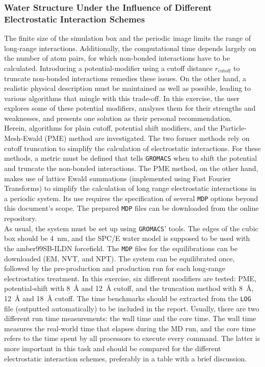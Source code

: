 \documentclass[9pt,tutorial]{livecoms}
\begin{document}
\subsubsection*{Water Structure Under the Influence of Different Electrostatic Interaction Schemes}
The finite size of the simulation box and the periodic image limits the range of long-range interactions. Additionally, the computational time depends largely on the number of atom pairs, for which non-bonded interactions have to be calculated. Introducing a potential-modifier using a cutoff distance $r_\text{cutoff}$ to truncate non-bonded interactions remedies these issues. On the other hand, a realistic physical description must be maintained as well as possible, leading to various algorithms that mingle with this trade-off. In this exercise, the user explores some of these potential modifiers, analyses them for their strengths and weaknesses, and presents one solution as their personal recommendation.\\
Herein, algorithms for plain cutoff, potential shift modifiers, and the Particle-Mesh-Ewald (PME) method are investigated. The two former methods rely on cutoff truncation to simplify the calculation of electrostatic interactions. For these methods, a metric must be defined that tells \texttt{GROMACS} when to shift the potential and truncate the non-bonded interactions. The PME method, on the other hand, makes use of lattice Ewald summations (implemented using Fast Fourier Transforms) to simplify the calculation of long range electrostatic interactions in a periodic system. Its use requires the specification of several \texttt{MDP} options beyond this document's scope. The prepared \texttt{MDP} files can be downloaded from the online repository.\\
As usual, the system must be set up using \texttt{GROMACS}' tools. The edges of the cubic box should be \SI{4}{\nano\meter}, and the SPC/E water model is supposed to be used with the amber99SB-ILDN forcefield. The \texttt{MDP} files for the equilibrations can be downloaded (EM, NVT, and NPT). The system can be equilibrated once, followed by the pre-production and production run for each long-range electrostatics treatment. In this exercise, six different modifiers are tested: PME, potential-shift with \SI{8}{\angstrom} and \SI{12}{\angstrom} cutoff, and the truncation method with \SI{8}{\angstrom}, \SI{12}{\angstrom} and \SI{18}{\angstrom} cutoff. The time benchmarks should be extracted from the \texttt{LOG} file (outputted automatically) to be included in the report. Usually, there are two different run time measurements: the wall time and the core time. The wall time measures the real-world time that elapses during the MD run, and the core time refers to the time spent by all processors to execute every command. The latter is more important in this task and should be compared for the different electrostatic interaction schemes, preferably in a table with a brief discussion.\\
\end{document}
